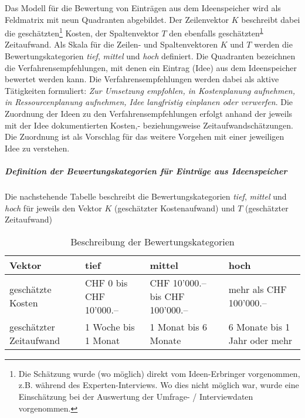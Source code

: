 \documentclass[../../main.tex]{subfiles}
\begin{document}
\begin{sloppypar}
Das Modell für die Bewertung von Einträgen aus dem Ideenspeicher wird als Feldmatrix mit neun Quadranten abgebildet. Der Zeilenvektor $K$ beschreibt dabei die geschätzten\footnote{\label{note_schaetzung}Die Schätzung wurde (wo möglich) direkt vom Ideen-Erbringer vorgenommen, z.B. während des Experten-Interviews. Wo dies nicht möglich war, wurde eine Einschätzung bei der Auswertung der Umfrage- / Interviewdaten vorgenommen.} Kosten, der Spaltenvektor $T$ den ebenfalls geschätzten\textsuperscript{\ref{note_schaetzung}} Zeitaufwand. Als Skala für die Zeilen- und Spaltenvektoren $K$ und $T$ werden die Bewertungskategorien \textit{tief}, \textit{mittel} und \textit{hoch} definiert. Die Quadranten bezeichnen die Verfahrensempfehlungen, mit denen ein Eintrag (Idee) aus dem Ideenspeicher bewertet werden kann. Die Verfahrensempfehlungen werden dabei als aktive Tätigkeiten formuliert: \textit{Zur Umsetzung empfohlen, in Kostenplanung aufnehmen, in Ressourcenplanung aufnehmen, Idee langfristig einplanen oder verwerfen}. Die Zuordnung der Ideen zu den Verfahrensempfehlungen erfolgt anhand der jeweils mit der Idee dokumentierten Kosten,- beziehungsweise Zeitaufwandschätzungen. Die Zuordnung ist als Vorschlag für das weitere Vorgehen mit einer jeweiligen Idee zu verstehen. 
\end{sloppypar}

\subparagraph*{Definition der Bewertungskategorien für Einträge aus Ideenspeicher}\mbox{}

\begin{sloppypar}
Die nachstehende Tabelle beschreibt die Bewertungskategorien \textit{tief}, \textit{mittel} und \textit{hoch} für jeweils den Vektor $K$ (geschätzter Kostenaufwand) und $T$ (geschätzter Zeitaufwand)
\end{sloppypar}


\sloppy 
\begin{table}[H]
\tablefontsize	
\centering
\caption{Beschreibung der Bewertungskategorien}
\label{beschreibung_bewertungskategorien}
\begin{tabular}{ |p{3.5cm}|p{3.5cm}|p{4.5cm}|p{4.5cm}|}

\hline
\tableheaderbgcolor
\textbf{Vektor} & \textbf{tief} & \textbf{mittel} & \textbf{hoch}\\ 
\hline
geschätzte Kosten & CHF 0 bis CHF 10'000.-- & CHF 10'000.-- bis  CHF 100'000.-- & mehr als CHF 100'000.-- \\
\hline
geschätzter Zeitaufwand & 1 Woche bis 1 Monat & 1 Monat bis 6 Monate & 6 Monate bis 1 Jahr oder mehr \\
\hline

\end{tabular}
\end{table}
\end{document}
